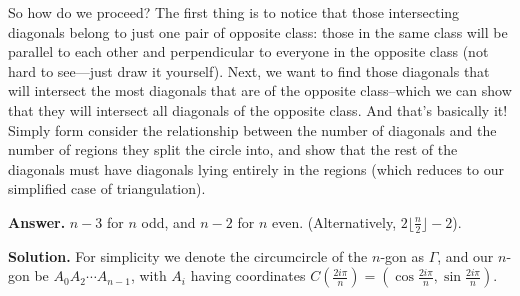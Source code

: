\documentclass[11pt,a4paper]{article}
\begin{document}
\begin{itemize}
So how do we proceed? The first thing is to notice that those intersecting diagonals belong to just one pair of opposite class: those in the same class will be parallel to each other and perpendicular to everyone in the opposite class (not hard to see---just draw it yourself). Next, we want to find those diagonals that will intersect the most diagonals that are of the opposite class--which we can show that they will intersect all diagonals of the opposite class. And that's basically it! Simply form consider the relationship between the number of diagonals and the number of regions they split the circle into, and show that the rest of the diagonals must have diagonals lying entirely in the regions (which reduces to our simplified case of triangulation). 

\textbf {Answer. }$n-3$ for $n$ odd, and $n-2$ for $n$ even. (Alternatively, $2\lfloor \frac n2\rfloor-2$). 

\textbf{Solution.}
For simplicity we denote the circumcircle of the $n$-gon as $\Gamma$, and our $n$-gon be $A_0A_2\cdots A_{n-1}$, 
with $A_i$ having coordinates $C\left(\frac{2i\pi}{n}\right)=\left(\cos\frac{2i\pi}{n}, \sin\frac{2i\pi}{n}\right)$. 


\end{itemize}
\end{document}
